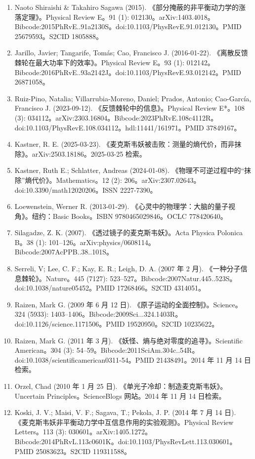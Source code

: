 \begin{enumerate}
\item Naoto Shiraishi & Takahiro Sagawa (2015). 《部分掩蔽的非平衡动力学的涨落定理》。Physical Review E。91 (1): 012130。arXiv:1403.4018。Bibcode:2015PhRvE..91a2130S。doi:10.1103/PhysRevE.91.012130。PMID 25679593。S2CID 1805888。
\item Jarillo, Javier; Tangarife, Tomás; Cao, Francisco J. (2016-01-22). 《离散反馈棘轮在最大功率下的效率》。Physical Review E。93 (1): 012142。Bibcode:2016PhRvE..93a2142J。doi:10.1103/PhysRevE.93.012142。PMID 26871058。
\item Ruiz-Pino, Natalia; Villarrubia-Moreno, Daniel; Prados, Antonio; Cao-García, Francisco J. (2023-09-12). 《反馈棘轮中的信息》。Physical Review E*。108 (3): 034112。arXiv:2303.16804。Bibcode:2023PhRvE.108c4112R。doi:10.1103/PhysRevE.108.034112。hdl:11441/161971。PMID 37849167。
\item Kastner, R. E. (2025-03-23). 《麦克斯韦妖被击败：测量的熵代价，而非抹除》。arXiv:2503.18186。2025-03-25 检索。
\item Kastner, Ruth E.; Schlatter, Andreas (2024-01-08). 《物理不可逆过程中的“抹除”熵代价》。Mathematics。12 (2): 206。arXiv:2307.02643。doi:10.3390/math12020206。ISSN 2227-7390。
\item Loewenstein, Werner R. (2013-01-29). 《心灵中的物理学：大脑的量子视角》。纽约：Basic Books。ISBN 9780465029846。OCLC 778420640。
\item Silagadze, Z. K. (2007). 《透过镜子的麦克斯韦妖》。Acta Physica Polonica B。38 (1): 101–126。arXiv:physics/0608114。Bibcode:2007AcPPB..38..101S。
\item Serreli, V; Lee, C. F.; Kay, E. R.; Leigh, D. A. (2007 年 2 月). 《一种分子信息棘轮》。Nature。445 (7127): 523–527。Bibcode:2007Natur.445..523S。doi:10.1038/nature05452。PMID 17268466。S2CID 4314051。
\item Raizen, Mark G. (2009 年 6 月 12 日). 《原子运动的全面控制》。Science。324 (5933): 1403–1406。Bibcode:2009Sci...324.1403R。doi:10.1126/science.1171506。PMID 19520950。S2CID 10235622。
\item Raizen, Mark G. (2011 年 3 月). 《妖怪、熵与绝对零度的追寻》。Scientific American。304 (3): 54–59。Bibcode:2011SciAm.304c..54R。doi:10.1038/scientificamerican0311-54。PMID 21438491。2014 年 11 月 14 日检索。
\item Orzel, Chad (2010 年 1 月 25 日). 《单光子冷却：制造麦克斯韦妖》。Uncertain Principles。ScienceBlogs 网站。2014 年 11 月 14 日检索。
\item Koski, J. V.; Maisi, V. F.; Sagava, T.; Pekola, J. P. (2014 年 7 月 14 日). 《麦克斯韦妖非平衡动力学中互信息作用的实验观测》。Physical Review Letters。113 (3): 030601。arXiv:1405.1272。Bibcode:2014PhRvL.113c0601K。doi:10.1103/PhysRevLett.113.030601。PMID 25083623。S2CID 119311588。

\end{enumerate}
